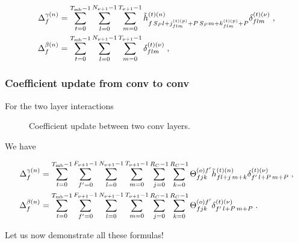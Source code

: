\begin{align}
\Delta_f^{\gamma(n)}&=
%
\sum_{t=0}^{T_{{\rm mb}}-1}\sum_{l=0}^{N_{\nu+1}-1}\sum_{m=0}^{T_{\nu+1}-1}
%
\tilde{h}_{f\,S_P l+j_{flm}^{(t)(p)}+P\,S_Pm+k_{flm}^{(t)(p)}+P}^{(t)(n)}\delta^{(t)(\nu)}_{flm}\;,\notag\\
%
\Delta_f^{\beta(n)}&=
%
\sum_{t=0}^{T_{{\rm mb}}-1}\sum_{l=0}^{N_{\nu+1}-1}\sum_{m=0}^{T_{\nu+1}-1}\delta^{(t)(\nu)}_{flm}\;,
\end{align}


\subsubsection{Coefficient update from conv to conv}

For the two layer interactions

\begin{figure}[H]
\begin{center}
\caption{Coefficient update between two conv layers.}
\end{center}
\end{figure}

We have


\begin{align}
\Delta_f^{\gamma(n)}&=
%
\sum_{t=0}^{T_{{\rm mb}}-1}\sum_{f'=0}^{F_{\nu+1}-1}\sum_{l=0}^{N_{\nu+1}-1}\sum_{m=0}^{T_{\nu+1}-1}
%
\sum_{j=0}^{R_C-1}\sum_{k=0}^{R_C-1}\Theta^{(o)f'}_{fjk}
%
\tilde{h}^{(t)(n)}_{fl+j\,m+k}\delta^{(t)(\nu)}_{f'\,l+P\,m+P}\;,\notag\\
%
\Delta_f^{\beta(n)}&=
%
\sum_{t=0}^{T_{{\rm mb}}-1}\sum_{f'=0}^{F_{\nu+1}-1}\sum_{l=0}^{N_{\nu+1}-1}\sum_{m=0}^{T_{\nu+1}-1}
%
\sum_{j=0}^{R_C-1}\sum_{k=0}^{R_C-1}\Theta^{(o)f'}_{fjk}\delta^{(t)(\nu)}_{f'\,l+P\,m+P}\;.
\end{align}

Let us now demonstrate all these formulas!

